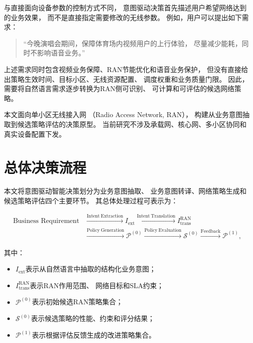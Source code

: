 \documentclass[lang=cn,12pt]{elegantbook}
\begin{document}
与直接面向设备参数的控制方式不同，
意图驱动决策首先描述用户希望网络达到的业务效果，
而不是直接指定需要修改的无线参数。
例如，用户可以提出如下需求：

\begin{quote}
“今晚演唱会期间，保障体育场内视频用户的上行体验，
尽量减少能耗，同时不影响语音业务。”
\end{quote}

上述需求同时包含视频业务保障、RAN节能优化和语音业务保护，
但没有直接给出策略生效时间、目标小区、无线资源配置、
调度权重和业务质量门限。
因此，需要将自然语言需求逐步转换为RAN侧可识别、
可计算和可评估的候选网络策略。

本文面向单小区无线接入网
（Radio Access Network, RAN），
构建从业务意图抽取到候选策略评估的决策原型。
当前研究不涉及承载网、核心网、多小区协同和真实设备配置下发。


\section{总体决策流程}
\label{sec:intent_decision_overview}

本文将意图驱动智能决策划分为业务意图抽取、
业务意图转译、网络策略生成和候选策略评估四个主要环节。
其总体处理过程可表示为：

\begin{equation}
\begin{aligned}
\text{Business Requirement}
&\xrightarrow{\mathrm{Intent\ Extraction}}
I_{\mathrm{ext}}
\xrightarrow{\mathrm{Intent\ Translation}}
I_{\mathrm{trans}}^{\mathrm{RAN}}
\\
&\xrightarrow{\mathrm{Policy\ Generation}}
\mathcal{P}^{(0)}
\xrightarrow{\mathrm{Policy\ Evaluation}}
\mathcal{S}^{(0)}
\xrightarrow{\mathrm{Feedback}}
\mathcal{P}^{(1)},
\end{aligned}
\label{eq:intent_decision_pipeline}
\end{equation}

其中：

\begin{itemize}
    \item $I_{\mathrm{ext}}$表示从自然语言中抽取的结构化业务意图；
    \item $I_{\mathrm{trans}}^{\mathrm{RAN}}$表示RAN作用范围、
    网络目标和SLA约束；
    \item $\mathcal{P}^{(0)}$表示初始候选RAN策略集合；
    \item $\mathcal{S}^{(0)}$表示候选策略的性能、约束和评分结果；
    \item $\mathcal{P}^{(1)}$表示根据评估反馈生成的改进策略集合。
\end{itemize}
\end{document}
